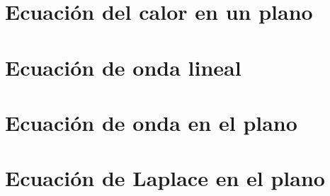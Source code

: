 

\section{Ecuación del calor en un plano}

\section{Ecuación de onda lineal}

\section{Ecuación de onda en el plano}

\section{Ecuación de Laplace en el plano}